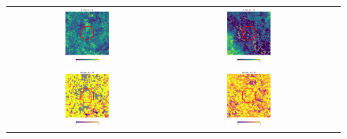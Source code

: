\documentclass[preprintm,linenumbers]{aastex631}
\begin{document}
\begin{figure}
\begin{tabular}{  c c c}
				\includegraphics[width=0.3\textwidth]{results/skymaps_cutout/skymaps_cutout_first_year_one_snap_v4_0_10yrs_db_noDD_noTwi_tscale-7_nside-256_doAllTemplateMetrics_reduceCount_r_WFD_noDD_noTwi.pdf} &
				\includegraphics[width=0.3\textwidth]{results/skymaps_cutout/skymaps_cutout_first_year_one_snap_v4_0_10yrs_db_noDD_noTwi_tscale-7_nside-256_doAllTemplateMetrics_reduceCount_r_GP_noDD_noTwi.pdf} \\
				\includegraphics[width=0.3\textwidth]{results/skymaps_cutout/skymaps_cutout_delta_first_year_one_snap_v4_0_10yrs_db_noDD_noTwi_tscale-7_nside-256_doAllTemplateMetrics_reduceCount_r_NES_noDD_noTwi.pdf} &
				\includegraphics[width=0.3\textwidth]{results/skymaps_cutout/skymaps_cutout_delta_first_year_one_snap_v4_0_10yrs_db_noDD_noTwi_tscale-7_nside-256_doAllTemplateMetrics_reduceCount_r_WFD_noDD_noTwi.pdf} &

\end{tabular}
\end{figure}
\end{document}
